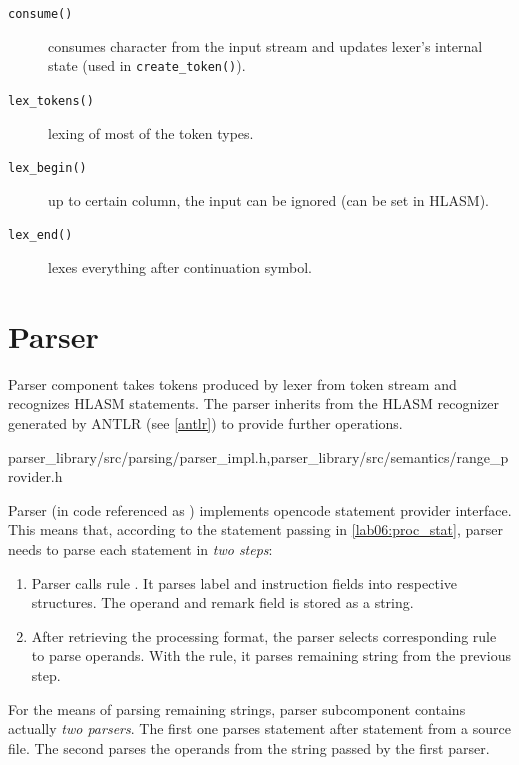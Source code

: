 \begin{description}
\begin{description}
		\item[\texttt{consume()}] consumes character from the input stream and updates lexer's internal state (used in \texttt{create\_token()}).
		
		\item[\texttt{lex\_tokens()}] lexing of most of the token types.
		
		\item[\texttt{lex\_begin()}] up to certain column, the input can be ignored (can be set in HLASM).
		
		\item[\texttt{lex\_end()}] lexes everything after continuation symbol.
		
		
	\end{description}
	
\end{description}


\section{Parser}
\label{lab06:parser}

Parser component takes tokens produced by lexer from token stream and recognizes HLASM statements.
The parser inherits from the HLASM recognizer generated by ANTLR (see \cref{antlr}) to provide further operations.

{parser\_library/src/parsing/parser\_impl.h,parser\_library/src/semantics/range\_provider.h}

Parser (in code referenced as ) implements opencode statement provider interface. This means that, according to the statement passing in \cref{lab06:proc_stat}, parser needs to parse each statement in \emph{two steps}:

\begin{enumerate}
	\item Parser calls rule . It parses label and instruction fields into respective structures. The operand and remark field is stored as a string.
	\item After retrieving the processing format, the parser selects corresponding rule to parse operands. With the rule, it parses remaining string from the previous step.
\end{enumerate}

For the means of parsing remaining strings, parser subcomponent contains actually \emph{two parsers}. The first one parses statement after statement from a source file. The second parses the operands from the string passed by the first parser. 

